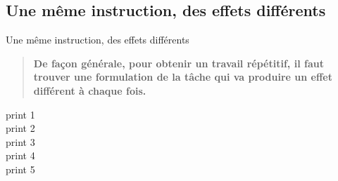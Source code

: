 \subsection{Une même instruction, des effets différents}
\begin{frame}{Une même instruction, des effets différents}
  \begin{quote}
    \bfseries
    De façon générale,
    pour obtenir un travail répétitif,
    il faut trouver une formulation de la tâche
    qui va produire un effet différent à chaque fois.
  \end{quote}

  \begin{wrong}
  \begin{langagenaturel}
    print 1\\
    print 2\\
    print 3\\
    print 4\\
    print 5
  \end{langagenaturel}
  \end{wrong}
\end{frame}

